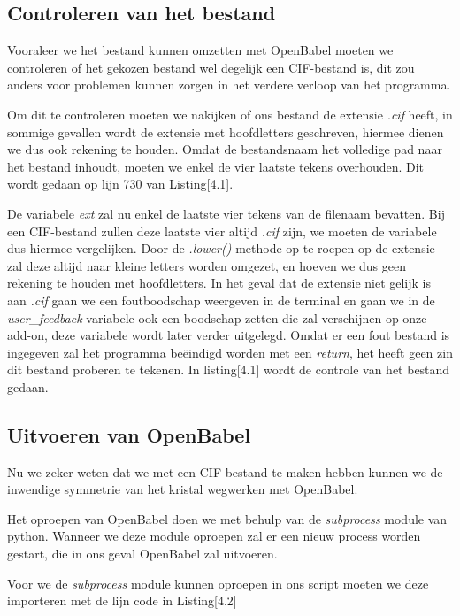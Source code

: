 \subsection{Controleren van het bestand}
Vooraleer we het bestand kunnen omzetten met OpenBabel moeten we controleren of het gekozen bestand wel degelijk een CIF-bestand is, dit zou anders voor problemen kunnen zorgen in het verdere verloop van het programma.
\par
Om dit te controleren moeten we nakijken of ons bestand de extensie \textit{.cif} heeft, in sommige gevallen wordt de extensie met hoofdletters geschreven, hiermee dienen we dus ook rekening te houden. Omdat de bestandsnaam het volledige pad naar het bestand inhoudt, moeten we enkel de vier laatste tekens overhouden. Dit wordt gedaan op lijn 730 van Listing[4.1].
\par 
De variabele \textit{ext} zal nu enkel de laatste vier tekens van de filenaam bevatten. Bij een CIF-bestand zullen deze laatste vier altijd \textit{.cif} zijn, we moeten de variabele dus hiermee vergelijken. Door de \textit{.lower()} methode op te roepen op de extensie zal deze altijd naar kleine letters worden omgezet, en hoeven we dus geen rekening te houden met hoofdletters. In het geval dat de extensie niet gelijk is aan \textit{.cif} gaan we een foutboodschap weergeven in de terminal en gaan we in de \textit{user\_feedback} variabele ook een boodschap zetten die zal verschijnen op onze add-on, deze variabele wordt later verder uitgelegd. Omdat er een fout bestand is ingegeven zal het programma beëindigd worden met een \textit{return}, het heeft geen zin dit bestand proberen te tekenen. In listing[4.1] wordt de controle van het bestand gedaan.



\subsection{Uitvoeren van OpenBabel}
Nu we zeker weten dat we met een CIF-bestand te maken hebben kunnen we de inwendige symmetrie van het kristal wegwerken met OpenBabel. 
\par
Het oproepen van OpenBabel doen we met behulp van de \textit{subprocess} module van python. Wanneer we deze module oproepen zal er een nieuw process worden gestart, die in ons geval OpenBabel zal uitvoeren.
\par
Voor we de \textit{subprocess} module kunnen oproepen in ons script moeten we  deze importeren met de lijn code in Listing[4.2]


